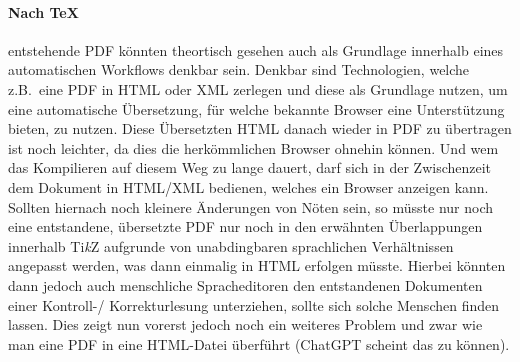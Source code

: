 \paragraph*{Nach TeX} entstehende PDF könnten theortisch gesehen auch als Grundlage innerhalb eines automatischen Workflows denkbar sein. Denkbar sind Technologien, welche z.B.\ eine PDF in HTML oder XML zerlegen und diese als Grundlage nutzen, um eine automatische Übersetzung, für welche bekannte Browser eine Unterstützung bieten, zu nutzen. Diese Übersetzten HTML danach wieder in PDF zu übertragen ist noch leichter, da dies die herkömmlichen Browser ohnehin können. Und wem das Kompilieren auf diesem Weg zu lange dauert, darf sich in der Zwischenzeit dem Dokument in HTML/XML bedienen, welches ein Browser anzeigen kann. Sollten hiernach noch kleinere Änderungen von Nöten sein, so müsste nur noch eine entstandene, übersetzte PDF nur noch in den erwähnten Überlappungen innerhalb Ti\textit{k}Z aufgrunde von unabdingbaren sprachlichen Verhältnissen angepasst werden, was dann einmalig in HTML erfolgen müsste. Hierbei könnten dann jedoch auch menschliche Spracheditoren den entstandenen Dokumenten einer Kontroll-/ Korrekturlesung unterziehen, sollte sich solche Menschen finden lassen. Dies zeigt nun vorerst jedoch noch ein weiteres Problem und zwar wie man eine PDF in eine HTML-Datei überführt (ChatGPT scheint das zu können).
